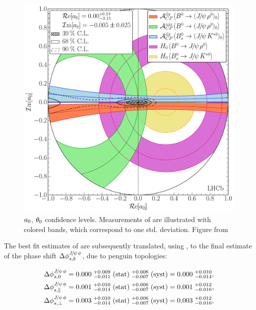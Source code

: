 \begin{figure}[!t]
  \centering
  \includegraphics[trim=0.0cm 0.0cm 0.0cm 0.0cm, clip=true,scale=0.4]{Figures/Chapter5/Penguin_Contribution_Re_vs_Im_allB2VV_Long_withH.pdf}
  \caption{$a_{0}$, $\theta_{0}$ confidence levels. Measurements of  are illustrated with 
           colored bands, which correspond to one std. deviation. Figure from \cite{DeBruyn-thesis}}
  \label{pengPlot_long}
\end{figure}

The best fit estimates of  are subsequently translated, using ,
to the final estimate of the phase shift $\Delta\phi^{{J\mskip -3mu/\mskip -2mu\psi\mskip 2mu}\phi}_{s,{k}}$, due to penguin topologies:

\begin{subequations}
\label{delta_phis_result}
\begin{align}   
\Delta\phi^{{J\mskip -3mu/\mskip -2mu\psi\mskip 2mu}\phi}_{s,{0}}         & = 0.000 \; ^{+0.009}_{-0.011} \; {\rm (stat)} \; ^{+0.006}_{-0.007} \; ({\rm syst}) = 0.000 \; ^{+0.010}_{-0.014},\\
\Delta\phi^{{J\mskip -3mu/\mskip -2mu\psi\mskip 2mu}\phi}_{s,{\parallel}} & = 0.001 \; ^{+0.010}_{-0.014} \; {\rm (stat)} \; ^{+0.006}_{-0.007} \; ({\rm syst)} = 0.001 \; ^{+0.012}_{-0.016},\\
\Delta\phi^{{J\mskip -3mu/\mskip -2mu\psi\mskip 2mu}\phi}_{s,{\perp}}     & = 0.003 \; ^{+0.010}_{-0.014} \; {\rm (stat)} \; ^{+0.006}_{-0.007} \; ({\rm syst)} = 0.003 \; ^{+0.012}_{-0.016},
\end{align}
\end{subequations}

